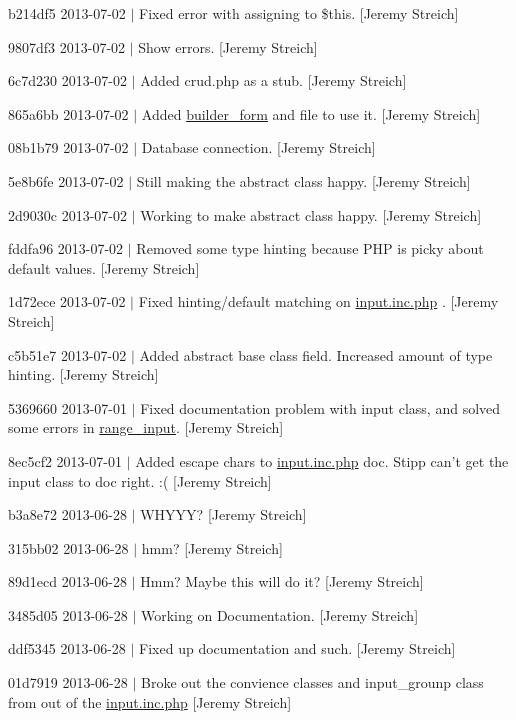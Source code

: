 \begin{DoxyItemize}
\item b214df5 2013-\/07-\/02 $|$ Fixed error with assigning to \$this. \mbox{[}Jeremy Streich\mbox{]}
\item 9807df3 2013-\/07-\/02 $|$ Show errors. \mbox{[}Jeremy Streich\mbox{]}
\item 6c7d230 2013-\/07-\/02 $|$ Added crud.\-php as a stub. \mbox{[}Jeremy Streich\mbox{]}
\item 865a6bb 2013-\/07-\/02 $|$ Added \hyperlink{classbuilder__form}{builder\-\_\-form} and file to use it. \mbox{[}Jeremy Streich\mbox{]}
\item 08b1b79 2013-\/07-\/02 $|$ Database connection. \mbox{[}Jeremy Streich\mbox{]}
\item 5e8b6fe 2013-\/07-\/02 $|$ Still making the abstract class happy. \mbox{[}Jeremy Streich\mbox{]}
\item 2d9030c 2013-\/07-\/02 $|$ Working to make abstract class happy. \mbox{[}Jeremy Streich\mbox{]}
\item fddfa96 2013-\/07-\/02 $|$ Removed some type hinting because P\-H\-P is picky about default values. \mbox{[}Jeremy Streich\mbox{]}
\item 1d72ece 2013-\/07-\/02 $|$ Fixed hinting/default matching on \hyperlink{input_8inc_8php}{input.\-inc.\-php} . \mbox{[}Jeremy Streich\mbox{]}
\item c5b51e7 2013-\/07-\/02 $|$ Added abstract base class field. Increased amount of type hinting. \mbox{[}Jeremy Streich\mbox{]}
\item 5369660 2013-\/07-\/01 $|$ Fixed documentation problem with input class, and solved some errors in \hyperlink{classrange__input}{range\-\_\-input}. \mbox{[}Jeremy Streich\mbox{]}
\item 8ec5cf2 2013-\/07-\/01 $|$ Added escape chars to \hyperlink{input_8inc_8php}{input.\-inc.\-php} doc. Stipp can't get the input class to doc right. \-:( \mbox{[}Jeremy Streich\mbox{]}
\item b3a8e72 2013-\/06-\/28 $|$ W\-H\-Y\-Y\-Y? \mbox{[}Jeremy Streich\mbox{]}
\item 315bb02 2013-\/06-\/28 $|$ hmm? \mbox{[}Jeremy Streich\mbox{]}
\item 89d1ecd 2013-\/06-\/28 $|$ Hmm? Maybe this will do it? \mbox{[}Jeremy Streich\mbox{]}
\item 3485d05 2013-\/06-\/28 $|$ Working on Documentation. \mbox{[}Jeremy Streich\mbox{]}
\item ddf5345 2013-\/06-\/28 $|$ Fixed up documentation and such. \mbox{[}Jeremy Streich\mbox{]}
\item 01d7919 2013-\/06-\/28 $|$ Broke out the convience classes and input\-\_\-grounp class from out of the \hyperlink{input_8inc_8php}{input.\-inc.\-php} \mbox{[}Jeremy Streich\mbox{]}

\end{DoxyItemize}
